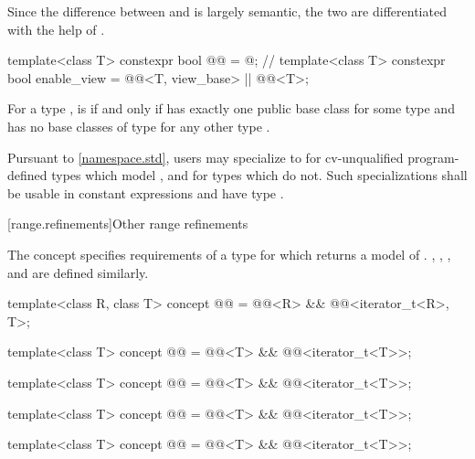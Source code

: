 \pnum
Since the difference between  and  is largely
semantic, the two are differentiated with the help of .

%
\begin{itemdecl}
template<class T>
  constexpr bool @@ = @\seebelownc@;            // \expos
template<class T>
  constexpr bool enable_view =
    @@<T, view_base> || @@<T>;
\end{itemdecl}

\begin{itemdescr}
\pnum
For a type ,
 is 
if and only if
 has exactly one public base class 
for some type  and
 has no base classes of type 
for any other type .

\pnum
\remarks
Pursuant to \ref{namespace.std}, users may specialize 
to 
for cv-unqualified program-defined types which model ,
and  for types which do not.
Such specializations shall
be usable in constant expressions and
have type .
\end{itemdescr}

[range.refinements]{Other range refinements}

\pnum
The  concept specifies requirements of a
 type for which  returns
a model of .
, , ,
and  are defined similarly.

\begin{itemdecl}
template<class R, class T>
  concept @@ =
    @@<R> && @@<iterator_t<R>, T>;

template<class T>
  concept @@ =
    @@<T> && @@<iterator_t<T>>;

template<class T>
  concept @@ =
    @@<T> && @@<iterator_t<T>>;

template<class T>
  concept @@ =
    @@<T> && @@<iterator_t<T>>;

template<class T>
  concept @@ =
    @@<T> && @@<iterator_t<T>>;
\end{itemdecl}

